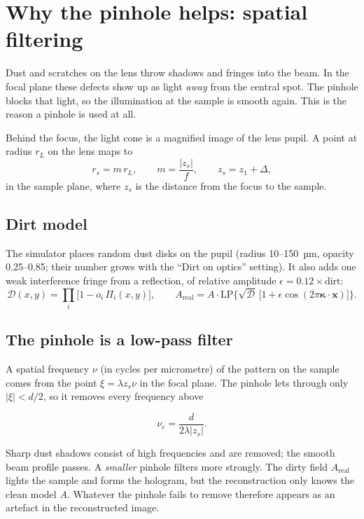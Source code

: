 \documentclass[12pt,a4paper]{article}
\begin{document}
\section{Why the pinhole helps: spatial filtering}
\label{sec:filter}

\begin{short}
Dust and scratches on the lens throw shadows and fringes into the beam. In the focal plane these
defects show up as light \emph{away} from the central spot. The pinhole blocks that light, so the
illumination at the sample is smooth again. This is the reason a pinhole is used at all.
\end{short}

Behind the focus, the light cone is a magnified image of the lens pupil. A point at radius $r_L$ on the lens maps to
\begin{equation}
r_s=m\,r_L,\qquad m=\frac{|z_s|}{f},\qquad z_s=z_1+\Delta,
\end{equation}
in the sample plane, where $z_s$ is the distance from the focus to the sample.

\subsection{Dirt model}
The simulator places random dust disks on the pupil (radius 10--150~µm, opacity 0.25--0.85; their number grows with the ``Dirt on optics'' setting). It also adds one weak interference fringe from a reflection, of relative amplitude $\epsilon=0.12\times\text{dirt}$:
\begin{equation}
\mathcal{D}(x,y)=\prod_i\big[1-o_i\,\Pi_i(x,y)\big],\qquad
A_\mathrm{real}=A\cdot\mathrm{LP}\Big\{\sqrt{\mathcal{D}}\,\big[1+\epsilon\cos(2\pi\bm\kappa\cdot\bm x)\big]\Big\}.
\end{equation}

\subsection{The pinhole is a low-pass filter}
A spatial frequency $\nu$ (in cycles per micrometre) of the pattern on the sample comes from the point $\xi=\lambda z_s\nu$ in the focal plane. The pinhole lets through only $|\xi|<d/2$, so it removes every frequency above
\begin{keyeq}
\begin{equation}
\nu_c=\frac{d}{2\lambda|z_s|}.
\label{eq:lp}
\end{equation}
\end{keyeq}
Sharp dust shadows consist of high frequencies and are removed; the smooth beam profile passes. A \emph{smaller} pinhole filters more strongly. The dirty field $A_\mathrm{real}$ lights the sample and forms the hologram, but the reconstruction only knows the clean model $A$. Whatever the pinhole fails to remove therefore appears as an artefact in the reconstructed image.
\end{document}
